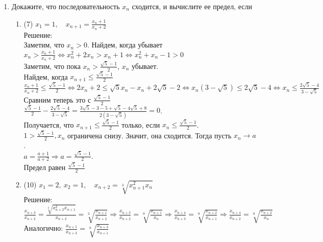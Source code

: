 \documentclass[a4paper]{article}
\begin{document}
\begin{enumerate}
    \item Докажите, что последовательность $x_n$ сходится, и вычислите ее предел, если
    \begin{enumerate}
        \item (7) $x_1=1,\quad x_{n+1}=\frac{x_n + 1}{x_n + 2}$\\
        Решение:\\ 
        Заметим, что $x_n > 0$. Найдем, когда убывает\\
        $x_n > \frac{x_n + 1}{x_n + 2} \Leftrightarrow x_n^2 + 2x_n > x_n + 1 \Leftrightarrow x_n^2 + x_n - 1 > 0$\\
        Заметим, что пока $x_n > \frac{\sqrt{5} - 1}{2}$, $x_n$ убывает.\\
        Найдем, когда $x_{n+1} \le \frac{\sqrt{5} - 1}{2}$\\
        $\frac{x_n + 1}{x_n + 2} \le \frac{\sqrt{5} - 1}{2} \Leftrightarrow 2x_n + 2 \le \sqrt{5}x_n - x_n + 2\sqrt{5} - 2 \Leftrightarrow x_n(3 - \sqrt{5}) \le 2\sqrt{5} - 4 \Leftrightarrow x_n \le \frac{2\sqrt{5} - 4}{3 - \sqrt{5}}$\\
        Сравним теперь это с $\frac{\sqrt{5} - 1}{2}$\\
        $\frac{\sqrt{5} - 1}{2} - \frac{2\sqrt{5} - 4}{3 - \sqrt{5}} = \frac{3\sqrt{5} - 3 - 5 + \sqrt{5} - 4\sqrt{5} + 8}{2(3 - \sqrt{5})} = 0$.\\
        Получается, что $x_{n+1} \le \frac{\sqrt{5} - 1}{2}$ только, если $x_{n} \le \frac{\sqrt{5} - 1}{2}$.\\
        $1 > \frac{\sqrt{5} - 1}{2}, x_n$ ограничена снизу. Значит, она сходится. Тогда пусть $x_n \rightarrow a$.\\
        $a = \frac{a+1}{a+2} \Rightarrow a = \frac{\sqrt{5} - 1}{2}$.\\
        Предел равен $\frac{\sqrt{5} - 1}{2}$
        \item (10) $x_1 = 2,\ x_2 = 1,\quad x_{n+2} = \sqrt[3]{x_{n+1}^2x_n}$\\
        Решение:\\
        $\frac{x_{n+3}}{x_{n+2}} = \frac{\sqrt[3]{x_{n+2}^2x_{n+1}}}{x_{n+2}} =
        \sqrt[3]{\frac{x_{n+1}}{x_{n+2}}} \Rightarrow \frac{x_{n+3}}{x_{n+2}} =
        \sqrt[9]{\frac{x_{n+1}}{x_n}} \Rightarrow \frac{x_{n+4}}{x_{n+3}} = 
        \sqrt[9]{\frac{x_{n+2}}{x_{n+1}}} \Rightarrow \frac{x_{n+4}}{x_{n+2}} = 
        \sqrt[9]{\frac{x_{n+2}}{x_{n}}}$\\
        Аналогично: $\frac{x_{n+5}}{x_{n+3}} = \sqrt[9]{\frac{x_{n+3}}{x_{n+1}}}$\\

\end{enumerate}
\end{enumerate}
\end{document}
